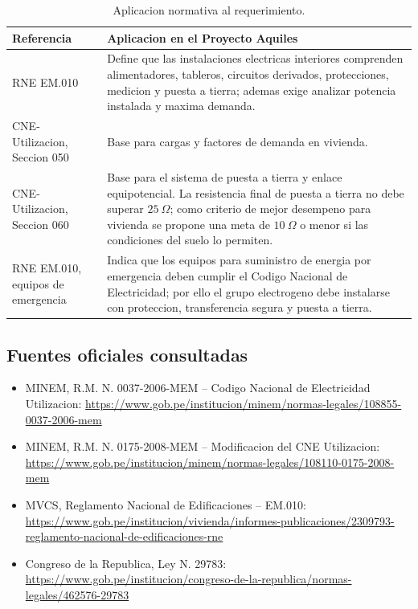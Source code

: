 \documentclass[12pt,letterpaper]{report}
\newcommand{\reqheader}{\rowcolor{modelblue!14}}
\begin{document}
\begin{table}[H]
\centering
\caption{Aplicacion normativa al requerimiento.}
\renewcommand{\arraystretch}{1.18}
\begin{tabularx}{\textwidth}{P{0.32\textwidth} L}
\toprule
\reqheader \textbf{Referencia} & \textbf{Aplicacion en el Proyecto Aquiles} \\
\midrule
RNE EM.010 & Define que las instalaciones electricas interiores comprenden alimentadores, tableros, circuitos derivados, protecciones, medicion y puesta a tierra; ademas exige analizar potencia instalada y maxima demanda. \\
CNE-Utilizacion, Seccion 050 & Base para cargas y factores de demanda en vivienda. \\
CNE-Utilizacion, Seccion 060 & Base para el sistema de puesta a tierra y enlace equipotencial. La resistencia final de puesta a tierra no debe superar \(25\ \Omega\); como criterio de mejor desempeno para vivienda se propone una meta de \(10\ \Omega\) o menor si las condiciones del suelo lo permiten. \\
RNE EM.010, equipos de emergencia & Indica que los equipos para suministro de energia por emergencia deben cumplir el Codigo Nacional de Electricidad; por ello el grupo electrogeno debe instalarse con proteccion, transferencia segura y puesta a tierra. \\
\bottomrule
\end{tabularx}
\end{table}

\subsection{Fuentes oficiales consultadas}

\begin{itemize}
  \item MINEM, R.M. N. 0037-2006-MEM -- Codigo Nacional de Electricidad Utilizacion: \url{https://www.gob.pe/institucion/minem/normas-legales/108855-0037-2006-mem}
  \item MINEM, R.M. N. 0175-2008-MEM -- Modificacion del CNE Utilizacion: \url{https://www.gob.pe/institucion/minem/normas-legales/108110-0175-2008-mem}
  \item MVCS, Reglamento Nacional de Edificaciones -- EM.010: \url{https://www.gob.pe/institucion/vivienda/informes-publicaciones/2309793-reglamento-nacional-de-edificaciones-rne}
  \item Congreso de la Republica, Ley N. 29783: \url{https://www.gob.pe/institucion/congreso-de-la-republica/normas-legales/462576-29783}
\end{itemize}
\end{document}

